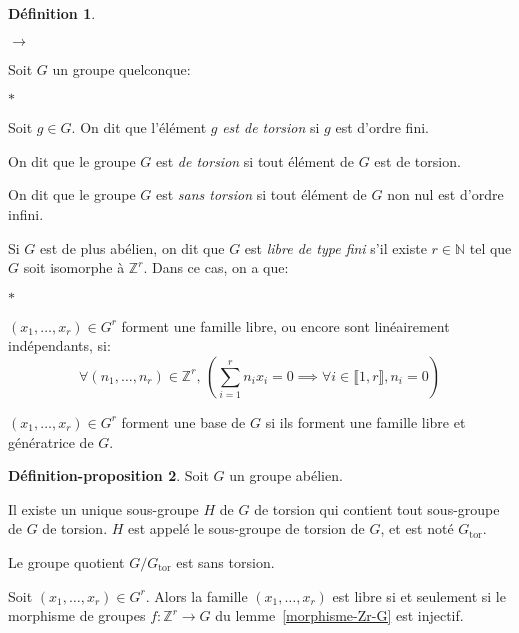 \documentclass{report}
\newcommand{\Z}{\mathbb{Z}}
\newcommand{\N}{\mathbb{N}}
\newcommand{\Gt}{G_{\mathrm{tor}}}
\newcommand{\dis}{\displaystyle}
\newenvironment{ls}{\begin{list}{$\to$}{}}{\end{list}}
\newenvironment{lls}{\begin{list}{$\ast$}{}}{\end{list}}
\newcommand{\nt}[1]{\llbracket  #1 \rrbracket }
\theoremstyle{definition}
\newtheorem{defi}{Définition}[chapter]
\newtheorem{depro}[defi]{Définition-proposition}
\theoremstyle{remark}
\begin{document}
\begin{defi}\hspace{.1em}
\begin{ls}
\item Soit $G$ un groupe quelconque:
\begin{lls}
\item Soit $g \in G$. On dit que l'élément $g$ \textit{est de torsion} si $g$ est d'ordre fini.
\item On dit que le groupe $G$ est \textit{de torsion} si tout élément de $G$ est de torsion.
\item On dit que le groupe $G$ est \textit{sans torsion} si tout élément de $G$ non nul est d'ordre infini.
\end{lls}

\item Si $G$ est de plus abélien, on dit que $G$ est \textit{libre de type fini} s'il existe $r \in \N$ tel que $G$ soit isomorphe à $\Z^r$.\bigbreak
Dans ce cas, on a que:
\begin{lls}
\item $(x_1, \ldots, x_r) \in G^r$ forment une famille libre, ou encore sont linéairement indépendants, si:
$$\forall (n_1, \ldots, n_r) \in \Z^r,\, \left(\dis \sum_{i=1}^r n_ix_i=0\implies\forall i \in \nt{1,r}, n_i=0\right)$$
\item $(x_1, \ldots, x_r) \in G^r$ forment une base de $G$ si ils forment une famille libre et génératrice de $G$.
\end{lls}
\end{ls}
\end{defi}

\begin{depro}\label{def-groupe-torsion}
Soit $G$ un groupe abélien.
\begin{point}
\item Il existe un unique sous-groupe $H$ de $G$ de torsion qui contient tout sous-groupe de $G$ de torsion. $H$ est appelé le sous-groupe de torsion de $G$, et est noté $\Gt$.
\item Le groupe quotient $G/\Gt$ est sans torsion.
\item Soit $(x_1, \ldots, x_r)  \in G^r$. Alors la famille  $(x_1, \ldots, x_r)$ est libre si et seulement si le morphisme de groupes $f:\Z^r\to G$ du lemme~\ref{morphisme-Zr-G} est injectif.
\end{point}
\end{depro}
\end{document}
